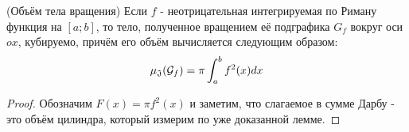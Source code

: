 \begin{theorem} (Объём тела вращения)
	Если $f$ - неотрицательная интегрируемая по Риману функция на $[a; b]$, то тело, полученное вращением её подграфика $G_f$ вокруг оси $ox$, кубируемо, причём его объём вычисляется следующим образом:
	\[
		\operatorname{\mu_\mathfrak{J}}(\mathcal{G}_f) = \pi \int_a^b f^2(x)dx
	\]
\end{theorem}

\begin{proof}
	Обозначим $F(x) = \pi f^2(x)$ и заметим, что слагаемое в сумме Дарбу - это объём цилиндра, который измерим по уже доказанной лемме.
\end{proof}
